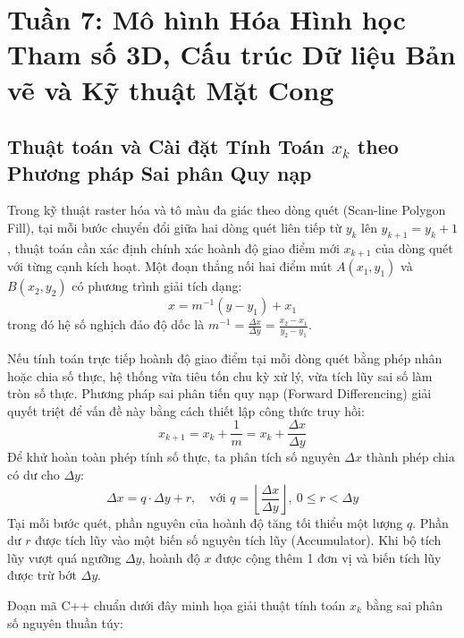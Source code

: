 \section{Tuần 7: Mô hình Hóa Hình học Tham số 3D, Cấu trúc Dữ liệu Bản vẽ và Kỹ thuật Mặt Cong}
\label{sec:week7}

\subsection{Thuật toán và Cài đặt Tính Toán \texorpdfstring{$x_k$}{xk} theo Phương pháp Sai phân Quy nạp}
\label{subsec:scanline_forward_differencing}

Trong kỹ thuật raster hóa và tô màu đa giác theo dòng quét (Scan-line Polygon Fill), tại mỗi bước chuyển đổi giữa hai dòng quét liên tiếp từ $y_k$ lên $y_{k+1} = y_k + 1$, thuật toán cần xác định chính xác hoành độ giao điểm mới $x_{k+1}$ của dòng quét với từng cạnh kích hoạt. Một đoạn thẳng nối hai điểm mút $A(x_1, y_1)$ và $B(x_2, y_2)$ có phương trình giải tích dạng:
\begin{equation}
x = m^{-1} (y - y_1) + x_1
\end{equation}
trong đó hệ số nghịch đảo độ dốc là $m^{-1} = \frac{\Delta x}{\Delta y} = \frac{x_2 - x_1}{y_2 - y_1}$.

Nếu tính toán trực tiếp hoành độ giao điểm tại mỗi dòng quét bằng phép nhân hoặc chia số thực, hệ thống vừa tiêu tốn chu kỳ xử lý, vừa tích lũy sai số làm tròn số thực. Phương pháp sai phân tiến quy nạp (Forward Differencing) giải quyết triệt để vấn đề này bằng cách thiết lập công thức truy hồi:
\begin{equation}
\label{eq:forward_diff_recurrence}
x_{k+1} = x_k + \frac{1}{m} = x_k + \frac{\Delta x}{\Delta y}
\end{equation}
Để khử hoàn toàn phép tính số thực, ta phân tích số nguyên $\Delta x$ thành phép chia có dư cho $\Delta y$:
\begin{equation}
\Delta x = q \cdot \Delta y + r, \quad \text{với } q = \left\lfloor \frac{\Delta x}{\Delta y} \right\rfloor, \ 0 \le r < \Delta y
\end{equation}
Tại mỗi bước quét, phần nguyên của hoành độ tăng tối thiểu một lượng $q$. Phần dư $r$ được tích lũy vào một biến số nguyên tích lũy (Accumulator). Khi bộ tích lũy vượt quá ngưỡng $\Delta y$, hoành độ $x$ được cộng thêm 1 đơn vị và biến tích lũy được trừ bớt $\Delta y$.

Đoạn mã C++ chuẩn dưới đây minh họa giải thuật tính toán $x_k$ bằng sai phân số nguyên thuần túy:

